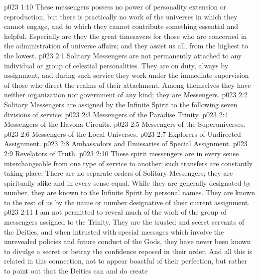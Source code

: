 \pc \vs p023 1:10 These messengers possess no power of personality extension or reproduction, but there is practically no work of the universes in which they cannot engage, and to which they cannot contribute something essential and helpful. Especially are they the great timesavers for those who are concerned in the administration of universe affairs; and they assist us all, from the highest to the lowest.
\vs p023 2:1 Solitary Messengers are not permanently attached to any individual or group of celestial personalities. They are on duty, always by assignment, and during such service they work under the immediate supervision of those who direct the realms of their attachment. Among themselves they have neither organization nor government of any kind; they are  Messengers.\plusone
\pc \vs p023 2:2 Solitary Messengers are assigned by the Infinite Spirit to the following seven divisions of service:
\pc \vs p023 2:3 \bibnobreakspace Messengers of the Paradise Trinity.
\vs p023 2:4 \bibnobreakspace Messengers of the Havona Circuits.
\vs p023 2:5 \bibnobreakspace Messengers of the Superuniverses.
\vs p023 2:6 \bibnobreakspace Messengers of the Local Universes.
\vs p023 2:7 \bibnobreakspace Explorers of Undirected Assignment.
\vs p023 2:8 \bibnobreakspace Ambassadors and Emissaries of Special Assignment.
\vs p023 2:9 \bibnobreakspace Revelators of Truth.
\pc \vs p023 2:10 These spirit messengers are in every sense interchangeable from one type of service to another; such transfers are constantly taking place. There are no separate orders of Solitary Messengers; they are spiritually alike and in every sense equal. While they are generally designated by number, they are known to the Infinite Spirit by personal names. They are known to the rest of us by the name or number designative of their current assignment.
\pc \vs p023 2:11 \bibnobreakspace {} I am not permitted to reveal much of the work of the group of messengers assigned to the Trinity. They are the trusted and secret servants of the Deities, and when intrusted with special messages which involve the unrevealed policies and future conduct of the Gods, they have never been known to divulge a secret or betray the confidence reposed in their order. And all this is related in this connection, not to appear boastful of their perfection, but rather to point out that the Deities can and do create 
